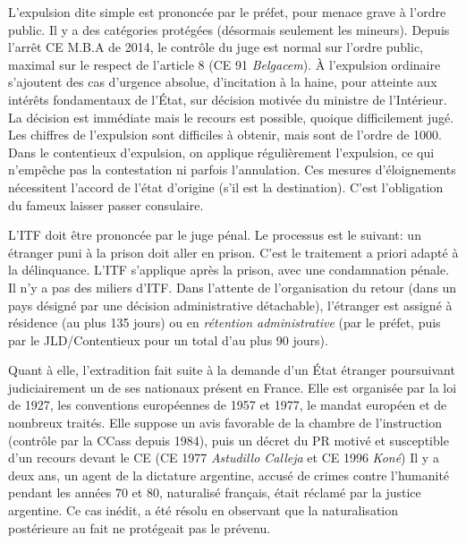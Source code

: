 \documentclass[math]{cours}
\begin{document}
L'expulsion dite simple est prononcée par le préfet, pour menace grave à l'ordre public.
Il y a des catégories protégées (désormais seulement les mineurs).
Depuis l'arrêt CE M.B.A de 2014, le contrôle du juge est normal sur l'ordre public, maximal sur le respect de l'article 8 (CE 91 \emph{Belgacem}).
À l'expulsion ordinaire s'ajoutent des cas d'urgence absolue, d'incitation à la haine, pour atteinte aux intérêts fondamentaux de l'État, sur décision motivée du ministre de l'Intérieur.
La décision est immédiate mais le recours est possible, quoique difficilement jugé.
Les chiffres de l'expulsion sont difficiles à obtenir, mais sont de l'ordre de 1000.
Dans le contentieux d'expulsion, on applique régulièrement l'expulsion, ce qui n'empêche pas la contestation ni parfois l'annulation.
Ces mesures d'éloignements nécessitent l'accord de l'état d'origine (s'il est la destination).
C'est l'obligation du fameux laisser passer consulaire.

L'ITF doit être prononcée par le juge pénal. Le processus est le suivant: un étranger puni à la prison doit aller en prison. C'est le traitement a priori adapté à la délinquance.
L'ITF s'applique après la prison, avec une condamnation pénale. Il n'y a pas des miliers d'ITF.
Dans l'attente de l'organisation du retour (dans un pays désigné par une décision administrative détachable), l'étranger est assigné à résidence (au plus 135 jours) ou en \emph{rétention administrative} (par le préfet, puis par le JLD/Contentieux pour un total d'au plus 90 jours).

Quant à elle, l'extradition fait suite à la demande d'un État étranger poursuivant judiciairement un de ses nationaux présent en France.
Elle est organisée par la loi de 1927, les conventions européennes de 1957 et 1977, le mandat européen et de nombreux traités.
Elle suppose un avis favorable de la chambre de l'instruction (contrôle par la CCass depuis 1984), puis un décret du PR motivé et susceptible d'un recours devant le CE (CE 1977 \emph{Astudillo Calleja} et CE 1996 \emph{Koné})
Il y a deux ans, un agent de la dictature argentine, accusé de crimes contre l'humanité pendant les années 70 et 80, naturalisé français, était réclamé par la justice argentine.
Ce cas inédit, a été résolu en observant que la naturalisation postérieure au fait ne protégeait pas le prévenu.
\end{document}
